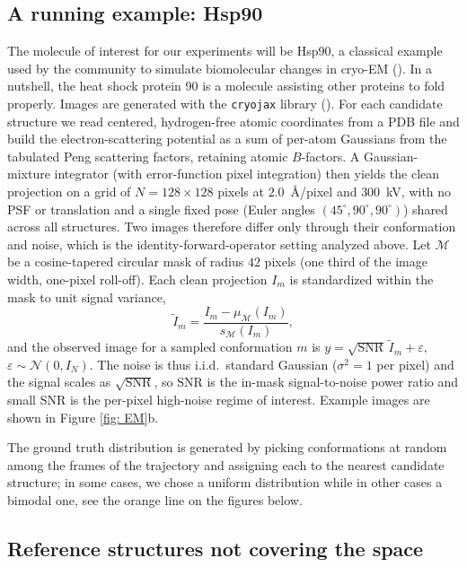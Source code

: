 \documentclass[12pt]{iopart}
\theoremstyle{remark}
\begin{document}
\subsection{A running example: Hsp90}
\label{sec: RunExp}

The molecule of interest for our experiments will be Hsp90, a classical example used by the community to simulate biomolecular changes in cryo-EM (\cite{seitz2019simulation}).
In a nutshell, the heat shock protein 90 is a molecule assisting other proteins to fold properly. Images are generated with the \texttt{cryojax} library (\cite{o2026cryojax}). For each candidate
structure we read centered, hydrogen-free atomic coordinates from a PDB file and
build the electron-scattering potential as a sum of per-atom Gaussians from the
tabulated Peng scattering factors, retaining atomic $B$-factors. A
Gaussian-mixture integrator (with error-function pixel integration) then yields
the clean projection on a grid of $N = 128\times128$ pixels at $2.0$~\AA{}/pixel
and $300$~kV, with no PSF or translation and a single fixed pose (Euler angles
$(45^\circ,90^\circ,90^\circ)$) shared across all structures. Two images
therefore differ only through their conformation and noise, which is the
identity-forward-operator setting analyzed above. Let $\mathcal{M}$ be a cosine-tapered circular mask of radius $42$ pixels (one
third of the image width, one-pixel roll-off). Each clean projection $I_m$ is
standardized within the mask to unit signal variance,
\[
  \tilde I_m = \frac{I_m - \mu_{\mathcal{M}}(I_m)}{s_{\mathcal{M}}(I_m)},
\]
and the observed image for a sampled conformation $m$ is
\(
  y = \sqrt{\mathrm{SNR}}\,\tilde I_m + \varepsilon,
  \) \( \varepsilon \sim \mathcal{N}(0,I_N).
\)
The noise is thus i.i.d.\ standard Gaussian ($\sigma^2 = 1$ per pixel) and the
signal scales as $\sqrt{\mathrm{SNR}}$, so $\mathrm{SNR}$ is the in-mask
signal-to-noise power ratio and small $\mathrm{SNR}$ is the per-pixel high-noise regime of
interest. Example images are shown in Figure \ref{fig: EM}b.

The ground truth distribution is generated by picking conformations at random among the frames of the trajectory and assigning each to the nearest candidate structure; in some cases, we chose a uniform distribution while in other cases a bimodal one, see the orange line on the figures below.

\subsection{Reference structures not covering the space}
\label{sec: ConfSpace}
\end{document}
